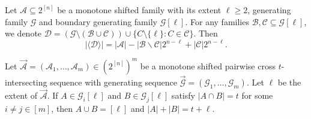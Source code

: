 \documentclass[10pt,a4paper]{amsart}
\begin{document}
\begin{lemma}\label{le1}
Let $\mathcal{A}\subseteq 2^{[n]}$ be a monotone shifted family with its extent $\ell\geq  2$, generating family $\mathcal{G}$ and boundary generating family $\mathcal{G}[\ell]$.  For any families $\mathcal{B}, \mathcal{C}\subseteq \mathcal{G}[\ell]$, we denote $\mathcal{D}=(\mathcal{G}\setminus(\mathcal{B}\cup\mathcal{C}))\cup\{C\setminus\{\ell\}: C\in\mathcal{C}\}$. Then
$$
{ |\langle\mathcal{D}\rangle|=|\mathcal{A}|-|\mathcal{B}\backslash\mathcal{C}|2^{n-\ell}+|\mathcal{C}|2^{n-\ell}.}
$$
\end{lemma}

\begin{lemma}\label{le2}
 Let $\vec{\mathcal{A}} = (\mathcal{A}_1, \ldots, \mathcal{A}_m) \in (2^{[n]})^{m}$ be  a monotone shifted pairwise cross $t$-intersecting sequence with  generating sequence  $\vec{\mathcal{G}} = (\mathcal{G}_1, \ldots, \mathcal{G}_m)$. Let $\ell$ be the extent of $\vec{\mathcal{A}}$. If 
$A\in \mathcal{G}_i[\ell]$ and  $B\in \mathcal{G}_j[\ell]$  satisfy $|A\cap B|=t$ for some $i\neq j\in [m]$, then $A\cup B=[\ell]$ and $|A|+|B|=t+\ell$.
\end{lemma}
\end{document}
